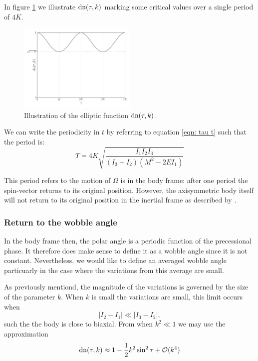 \documentclass[/home/greg/Thesis/main/main.tex]{subfiles}
\begin{document}
In figure \ref{fig: dn tau} we illustrate $\mathrm{dn}(\tau, k)$ marking some 
critical values over a single period of $4K$.
\begin{figure}
    \centering
    \includegraphics[width=0.5\textwidth]{img/dn_tau_k2}
    \caption{Illustration of the elliptic function $\mathrm{dn}(\tau, k)$.}
    \label{fig: dn tau}
\end{figure}
We can write the periodicity in $t$ by referring to equation \eqref{eqn: tau t}
such that the period is:
\begin{equation}
    T = 4K\sqrt{\frac{I_{1}I_{2}I_{3}}{(I_{3}-I_{2})(M^{2} - 2EI_{1})}}
\end{equation}

This period refers to the motion of $\Omega$ is in the body frame: after one period the 
spin-vector returns to its original position. However, the 
axisymmetric body itself will not return to its original position in the
inertial frame as described by \citet{Landau1969}.

\subsubsection{Return to the wobble angle}
In the body frame then, the polar angle is a periodic function of the precessional
phase. It therefore does make sense to define it as a wobble angle
since it is not constant. Nevertheless, we would like to define an averaged 
wobble angle particuarly in the case where the variations from this average are
small. 

As previously mentiond, the magnitude of the variations is governed by the 
size of the parameter $k$. When $k$ is small the variations are small, this 
limit occurs when
\begin{equation}
    |I_{2} - I_{1}| \ll |I_{3} - I_{2}|,
    \label{eqn: I23 limit}
\end{equation}
such the the body is close to biaxial. From \citet{Abramowitz1972} when
$k^{2} \ll 1$ we may use the approximation
\begin{equation}
    \mathrm{dn}(\tau, k) \approx 1 - \frac{1}{2}k^{2} \sin^{2}\tau + \mathcal{O}(k^{4})
\end{equation}
\end{document}
